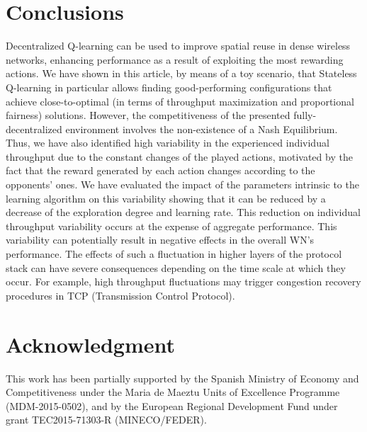 \documentclass[conference]{IEEEtran}
\begin{document}
	\section{Conclusions }
	\label{section:conclusions}		
	Decentralized Q-learning can be used to improve spatial reuse in dense wireless networks, enhancing performance as a result of exploiting the most rewarding actions. We have shown in this article, by means of a toy scenario, that Stateless Q-learning in particular allows finding good-performing configurations that achieve close-to-optimal (in terms of throughput maximization and proportional fairness) solutions. However, the competitiveness of the presented fully-decentralized environment involves the non-existence of a Nash Equilibrium. 
	Thus, we have also identified high variability in the experienced individual throughput due to the constant changes of the played actions, motivated by the fact that the reward generated by each action changes according to the opponents' ones. We have evaluated the impact of the parameters intrinsic to the learning algorithm on this variability showing that it can be reduced by a decrease of the exploration degree and learning rate. This reduction on individual throughput variability occurs at the expense of aggregate performance.
	This variability can potentially result in negative effects in the overall WN's performance. The effects of such a fluctuation in higher layers of the protocol stack can have severe consequences depending on the time scale at which they occur. For example, high throughput fluctuations may trigger congestion recovery procedures in TCP (Transmission Control Protocol). 
		
	\section*{Acknowledgment}
	This work has been partially supported by the Spanish Ministry of Economy and Competitiveness under the Maria de Maeztu Units of Excellence Programme (MDM-2015-0502), and by the European Regional Development Fund under grant TEC2015-71303-R (MINECO/FEDER). 
	
\end{document}
